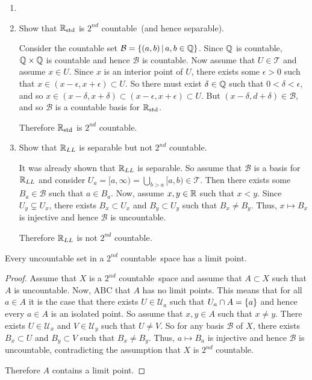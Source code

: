 \documentclass[letterpaper,12pt,fleqn]{article}
\newcommand{\T}{\mathscr{T}}
\newcommand{\B}{\mathcal{B}}
\newcommand{\U}{\mathcal{U}}
\renewcommand{\sc}{\(2^{nd}\) countable}
\newcommand{\Rs}{\R_{\text{std}}}
\newcommand{\RL}{\R_{LL}}
\newcommand{\e}{\epsilon}
\renewcommand{\d}{\delta}
\begin{document}
\begin{example}[Exercise 5.10]
  \begin{enumerate}
    \item[]
    \item Show that \(\Rs\) is \sc\ (and hence separable).

      Consider the countable set \(\B=\setb{(a,b)}{a,b\in\Q}\).  Since \(\mathbb{Q}\) is countable, \(\mathbb{Q}\times\mathbb{Q}\) is
      countable and hence \(\B\) is countable.  Now assume that \(U\in\T\) and assume \(x\in U\).  Since \(x\) is
      an interior point of \(U\), there exists some \(\e>0\) such that \(x\in(x-\e,x+\e)\subset U\).  So there must
      exist \(\d\in\Q\) such that \(0<\d<\e\), and so \(x\in(x-\d,x+\d)\subset(x-\e,x+\e)\subset U\).  But
      \((x-\d,d+\d)\in\B\), and so \(\B\) is a countable basis for \(\Rs\).

      Therefore \(\Rs\) is \sc.

    \item Show that \(\RL\) is separable but not \sc.

      It was already shown that \(\RL\) is separable.  So assume that \(\B\) is a basis for \(\RL\) and consider
      \(\displaystyle U_a=[a,\infty)=\bigcup_{b>a}[a,b)\in\T\).  Then there exists some \(B_a\in\B\) such that
      \(a\in B_a\).  Now, assume \(x,y\in\mathbb{R}\) such that \(x<y\).  Since \(U_y\subsetneq U_x\), there exists
      \(B_x\subset U_x\) and \(B_y\subset U_y\) such that \(B_x\ne B_y\).  Thus, \(x\mapsto B_x\) is injective
      and hence \(\B\) is uncountable.

      Therefore \(\RL\) is not \sc.
  \end{enumerate}
\end{example}

\begin{theorem}[5.11]
  Every uncountable set in a \sc\ space has a limit point.
\end{theorem}

\begin{proof}
  Assume that \(X\) is a \sc\ space and assume that \(A\subset X\) such that \(A\) is uncountable.  Now, ABC that
  \(A\) has no limit points.  This means that for all \(a\in A\) it is the case that there exists \(U\in\U_a\)
  such that \(U_a\cap A=\{a\}\) and hence every \(a\in A\) is an isolated point.  So assume that \(x,y\in A\)
  such that \(x\ne y\).  There exists \(U\in\U_x\) and \(V\in\U_y\) such that \(U\ne V\).  So for any basis
  \(\B\) of \(X\), there exists \(B_x\subset U\) and \(B_y\subset V\) such that \(B_x\ne B_y\).  Thus,
  \(a\mapsto B_a\) is injective and hence \(\B\) is uncountable, contradicting the assumption that \(X\)
  is \sc.

  Therefore \(A\) contains a limit point.
\end{proof}
\end{document}
